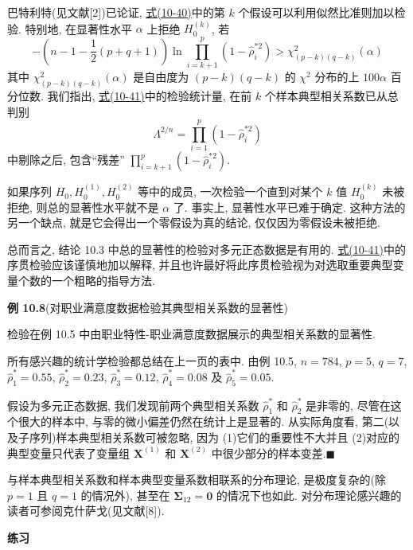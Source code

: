 
巴特利特(见文献[2])已论证, \hyperref[eq:10-40]{式(10-40)}中的第 $k$ 个假设可以利用似然比准则加以检验. 特别地, 在显著性水平 $\alpha$ 上拒绝 $H_0^{(k)}$, 若
\label{eq:10-41}
\begin{equation}
-\left(n-1-\frac{1}{2}(p+q+1)\right)\ln\prod_{i=k+1}^{p}(1-\hat{\rho}_i^{*2})>\chi^2_{(p-k)(q-k)}(\alpha)
\tag{10-41}
\end{equation}
其中 $\chi^2_{(p-k)(q-k)}(\alpha)$ 是自由度为 $(p-k)(q-k)$ 的 $\chi^2$ 分布的上 $100\alpha$ 百分位数. 我们指出, \hyperref[eq:10-41]{式(10-41)}中的检验统计量, 在前 $k$ 个样本典型相关系数已从总判别
\[
\Lambda^{2/n}=\prod_{i=1}^{p}(1-\hat{\rho}_i^{*2})
\]
中剔除之后, 包含“残差” $\prod\limits_{i=k+1}^{p}(1-\hat{\rho}_i^{*2})$.

如果序列 $H_0,H_0^{(1)},H_0^{(2)}$ 等中的成员, 一次检验一个直到对某个 $k$ 值 $H_0^{(k)}$ 未被拒绝, 则总的显著性水平就不是 $\alpha$ 了. 事实上, 显著性水平已难于确定. 这种方法的另一个缺点, 就是它会得出一个零假设为真的结论, 仅仅因为零假设未被拒绝.

总而言之, 结论 10.3 中总的显著性的检验对多元正态数据是有用的. \hyperref[eq:10-41]{式(10-41)}中的序贯检验应该谨慎地加以解释, 并且也许最好将此序贯检验视为对选取重要典型变量个数的一个粗略的指导方法.

\noindent\textbf{例 10.8}\quad (对职业满意度数据检验其典型相关系数的显著性)

检验在例 10.5 中由职业特性-职业满意度数据展示的典型相关系数的显著性.

所有感兴趣的统计学检验都总结在上一页的表中. 由例 10.5, $n=784$, $p=5$, $q=7$, $\hat{\rho}_1^*=0.55$, $\hat{\rho}_2^*=0.23$, $\hat{\rho}_3^*=0.12$, $\hat{\rho}_4^*=0.08$ 及 $\hat{\rho}_5^*=0.05$.

假设为多元正态数据, 我们发现前两个典型相关系数 $\hat{\rho}_1^*$ 和 $\hat{\rho}_2^*$ 是非零的, 尽管在这个很大的样本中, 与零的微小偏差仍然在统计上是显著的. 从实际角度看, 第二(以及子序列)样本典型相关系数可被忽略, 因为 (1)它们的重要性不大并且 (2)对应的典型变量只代表了变量组 $\mathbf{X}^{(1)}$ 和 $\mathbf{X}^{(2)}$ 中很少部分的样本变差.\hfill$\blacksquare$

与样本典型相关系数和样本典型变量系数相联系的分布理论, 是极度复杂的(除 $p=1$ 且 $q=1$ 的情况外), 甚至在 $\boldsymbol{\Sigma}_{12}=\mathbf{0}$ 的情况下也如此. 对分布理论感兴趣的读者可参阅克什萨戈(见文献[8]).

{\large\bfseries 练习}

